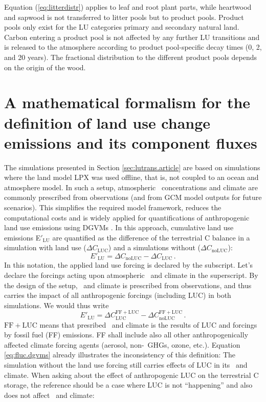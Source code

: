 Equation (\ref{eq:litterdistr}) applies to leaf and root plant parts, while heartwood and sapwood is not transferred to litter pools but to product pools. Product pools only exist for the LU categories primary and secondary natural land. Carbon entering a product pool is not affected by any further LU transitions and is released to the atmosphere according to product pool-specific decay times (0, 2, and 20 years). The fractional distribution to the different product pools depends on the origin of the wood.



\section{A mathematical formalism for the definition of land use change emissions and its component fluxes}
\label{sec:lucdef}
The simulations presented in Section \ref{sec:lutrans.article} are based on simulations where the land model LPX was used offline, that is, not coupled to an ocean and atmosphere model. In such a setup, atmospheric \coo\ concentrations and climate are commonly prescribed from observations (and from GCM model outputs for future scenarios). This simplifies the required model framework, reduces the computational costs and is widely applied for quantifications of anthropogenic land use emissions using DGVMs \citep{cramer01gcb,sitch2008gcb,lequere13essd}. In this approach, cumulative land use emissions E$'_{\text{LU}}$ are quantified as the difference of the terrestrial C balance in a simulation with land use ($\Delta C_{\mathrm{LUC}}$) and a simulations without ($\Delta C_{\mathrm{no LUC}}$):
\begin{equation}
E'_{\text{LU}} = \Delta C_{\mathrm{no LUC}} - \Delta C_{\mathrm{LUC}}\,.
\end{equation}
In this notation, the applied land use forcing is declared by the subscript. Let's declare the forcings acting upon atmospheric \coo\ and climate in the superscript. By the design of the setup, \coo\ and climate is prescribed from observations, and thus carries the impact of all anthropogenic forcings (including LUC) in both simulations. We would thus write
\begin{equation}
E'_{\text{LU}} = \Delta C^{\mathrm{FF+LUC}}_{\mathrm{LUC}} - \Delta C^{\mathrm{FF+LUC}}_{\mathrm{no LUC}}\,.
\label{eq:fluc.dgvms}
\end{equation}
$\mathrm{FF+LUC}$ means that presribed \coo\ and climate is the results of LUC and forcings by fossil fuel (FF) emissions. FF shall include also all other anthropogenically affected climate forcing agents (aerosol, non-\coo\ GHGs, ozone, etc.). Equation \ref{eq:fluc.dgvms} already illustrates the inconsistency of this definition: The simulation without the land use forcing still carries effects of LUC in its \coo\ and climate. When asking about the effect of anthropogenic LUC on the terrestrial C storage, the reference should be a case where LUC is not ``happening'' and also does not affect \coo\ and climate:
